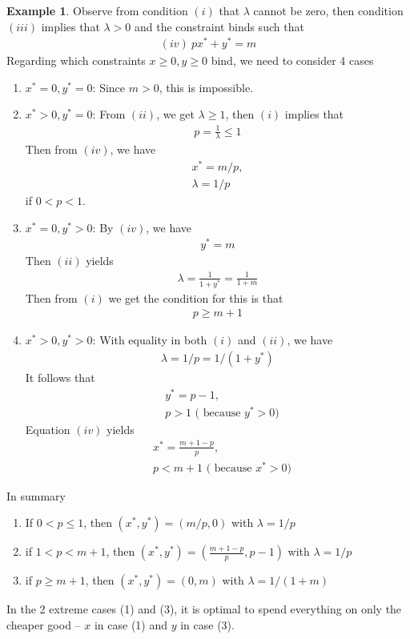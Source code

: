 \documentclass[11pt,a4paper]{book}
\theoremstyle{definition}\newtheorem{definition}{Definition}
\theoremstyle{definition}\newtheorem{fact}{Fact}
\theoremstyle{definition}\newtheorem{remark}{Remark}
\theoremstyle{definition}\newtheorem{ex}{Ex.}
\theoremstyle{definition}\newtheorem{project}{Project}
\theoremstyle{definition}\newtheorem{problem}{Problem}
\theoremstyle{definition}\newtheorem{example}{Example}
\numberwithin{theorem}{section}
\numberwithin{corollary}{chapter}
\numberwithin{assumption}{chapter}
\numberwithin{definition}{chapter}
\numberwithin{prop}{chapter}
\numberwithin{notation}{chapter}
\numberwithin{problem}{chapter}
\numberwithin{example}{chapter}
\numberwithin{fact}{chapter}
\numberwithin{ex}{chapter}
\begin{document}
\begin{example}
		Observe from condition $(i)$ that $\lambda$ cannot be zero, then condition $(iii)$ implies that $\lambda > 0$ and the constraint binds such that
		\begin{align*}
			(iv) \  px^* + y^* = m
		\end{align*}
		Regarding which constraints $x\geq 0, y \geq 0$ bind, we need to consider 4 cases
		\begin{enumerate}
			\item $x^*=0, y^* = 0$: Since $m>0$, this is impossible.
			\item $x^* > 0, y^* = 0$: From $(ii)$, we get $\lambda \geq 1$, then $(i)$ implies that
			\begin{align*}
				p = \frac{1}{\lambda} \leq 1
			\end{align*}
			Then from $(iv)$, we have
			\begin{align*}
				x^* = m/p, \\
				\lambda = 1/p
			\end{align*}	
			if $0 < p < 1$.
			\item $x^* = 0, y^* > 0$: By $(iv)$, we have 
			\begin{align*}
				y^* = m
			\end{align*}
			Then $(ii)$ yields 
			\begin{align*}
				\lambda = \frac{1}{1+y^*} = \frac{1}{1+m}
			\end{align*}
			Then from $(i)$ we get the condition for this is that
			\begin{align*}
				p \geq m+1
			\end{align*}
			\item $x^* > 0, y^* > 0$: With equality in both $(i)$ and $(ii)$, we have
			\begin{align*}
				\lambda = 1/p = 1/(1+y^*)
			\end{align*}
			It follows that
			\begin{align*}
				&y^* = p - 1, \\
				&p > 1 \text{ ( because $y^* > 0$)}
			\end{align*}
			Equation $(iv)$ yields
			\begin{align*}
				&x^* = \frac{m+1-p}{p}, \\
				&p < m+1 \text{ ( because $x^* > 0$)}
			\end{align*}
		\end{enumerate}
		In summary
		\begin{enumerate}
			\item If $0<p \leq 1$, then $(x^*, y^*)  = (m/p, 0)$ with $\lambda = 1/p$ 
			\item if $1<p< m+1$, then $(x^*, y^*) = (\frac{m+1-p}{p}, p-1)$ with $\lambda = 1/p$ 
			\item if $p \geq m+1$, then $(x^*, y^*)  = (0, m)$ with $\lambda = 1/(1+m)$
		\end{enumerate}
		In the 2 extreme cases (1) and (3), it is optimal to spend everything on only the cheaper good -- $x$ in case (1) and $y$ in case (3).
	\end{example}
	
\end{document}
